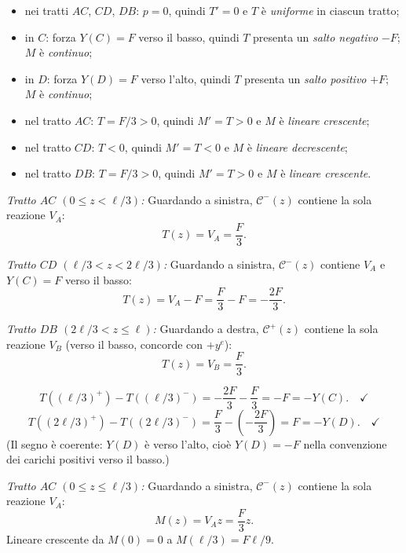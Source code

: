\begin{esempio}
\begin{svolgimento}
		\begin{itemize}[nosep]
			\item nei tratti $AC$, $CD$, $DB$: $p = 0$,
			quindi $T' = 0$ e $T$ è \emph{uniforme}
			in ciascun tratto;
			\item in $C$: forza $Y(C) = F$ verso il basso,
			quindi $T$ presenta un \emph{salto
				negativo} $-F$; $M$ è \emph{continuo};
			\item in $D$: forza $Y(D) = F$ verso l'alto,
			quindi $T$ presenta un \emph{salto
				positivo} $+F$; $M$ è \emph{continuo};
			\item nel tratto $AC$: $T = F/3 > 0$, quindi
			$M' = T > 0$ e $M$ è \emph{lineare
				crescente};
			\item nel tratto $CD$: $T < 0$, quindi
			$M' = T < 0$ e $M$ è \emph{lineare
				decrescente};
			\item nel tratto $DB$: $T = F/3 > 0$, quindi
			$M' = T > 0$ e $M$ è \emph{lineare
				crescente}.
		\end{itemize}
		
		
		\textit{Tratto $AC$ $(0 \leq z < \ell/3)$:}
		Guardando a sinistra, $\mathcal{C}^-(z)$
		contiene la sola reazione $V_A$:
		\[
		T(z) = V_A = \frac{F}{3}.
		\]
		
		\textit{Tratto $CD$ $(\ell/3 < z < 2\ell/3)$:}
		Guardando a sinistra, $\mathcal{C}^-(z)$
		contiene $V_A$ e $Y(C) = F$ verso il basso:
		\[
		T(z) = V_A - F = \frac{F}{3} - F = -\frac{2F}{3}.
		\]
		
		\textit{Tratto $DB$ $(2\ell/3 < z \leq \ell)$:}
		Guardando a destra, $\mathcal{C}^+(z)$
		contiene la sola reazione $V_B$ (verso il
		basso, concorde con $+y^e$):
		\[
		T(z) = V_B = \frac{F}{3}.
		\]
		
		\[
		T((\ell/3)^+) - T((\ell/3)^-)
		= -\frac{2F}{3} - \frac{F}{3} = -F = -Y(C).
		\quad\checkmark
		\]
		\[
		T((2\ell/3)^+) - T((2\ell/3)^-)
		= \frac{F}{3} - \left(-\frac{2F}{3}\right)
		= F = -Y(D).
		\quad\checkmark
		\]
		(Il segno è coerente: $Y(D)$ è verso l'alto,
		cioè $Y(D) = -F$ nella convenzione dei carichi
		positivi verso il basso.)
		
		
		\textit{Tratto $AC$ $(0 \leq z \leq \ell/3)$:}
		Guardando a sinistra, $\mathcal{C}^-(z)$
		contiene la sola reazione $V_A$:
		\[
		M(z) = V_A z = \frac{F}{3}z.
		\]
		Lineare crescente da $M(0) = 0$ a
		$M(\ell/3) = F\ell/9$.
		

\end{svolgimento}
\end{esempio}
